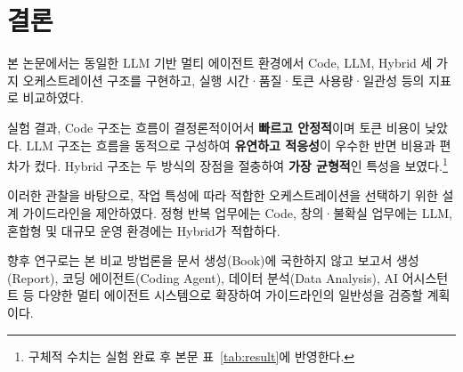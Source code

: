 \section{결론}

본 논문에서는 동일한 LLM 기반 멀티 에이전트 환경에서 Code, LLM, Hybrid
세 가지 오케스트레이션 구조를 구현하고, 실행 시간·품질·토큰 사용량·일관성
등의 지표로 비교하였다.

실험 결과, Code 구조는 흐름이 결정론적이어서 \textbf{빠르고 안정적}이며
토큰 비용이 낮았다. LLM 구조는 흐름을 동적으로 구성하여 \textbf{유연하고
적응성}이 우수한 반면 비용과 편차가 컸다. Hybrid 구조는 두 방식의 장점을
절충하여 \textbf{가장 균형적}인 특성을 보였다.\footnote{구체적 수치는
실험 완료 후 본문 표~\ref{tab:result}에 반영한다.}

이러한 관찰을 바탕으로, 작업 특성에 따라 적합한 오케스트레이션을 선택하기
위한 설계 가이드라인을 제안하였다. 정형 반복 업무에는 Code, 창의·불확실
업무에는 LLM, 혼합형 및 대규모 운영 환경에는 Hybrid가 적합하다.

향후 연구로는 본 비교 방법론을 문서 생성(Book)에 국한하지 않고 보고서
생성(Report), 코딩 에이전트(Coding Agent), 데이터 분석(Data Analysis),
AI 어시스턴트 등 다양한 멀티 에이전트 시스템으로 확장하여 가이드라인의
일반성을 검증할 계획이다.
